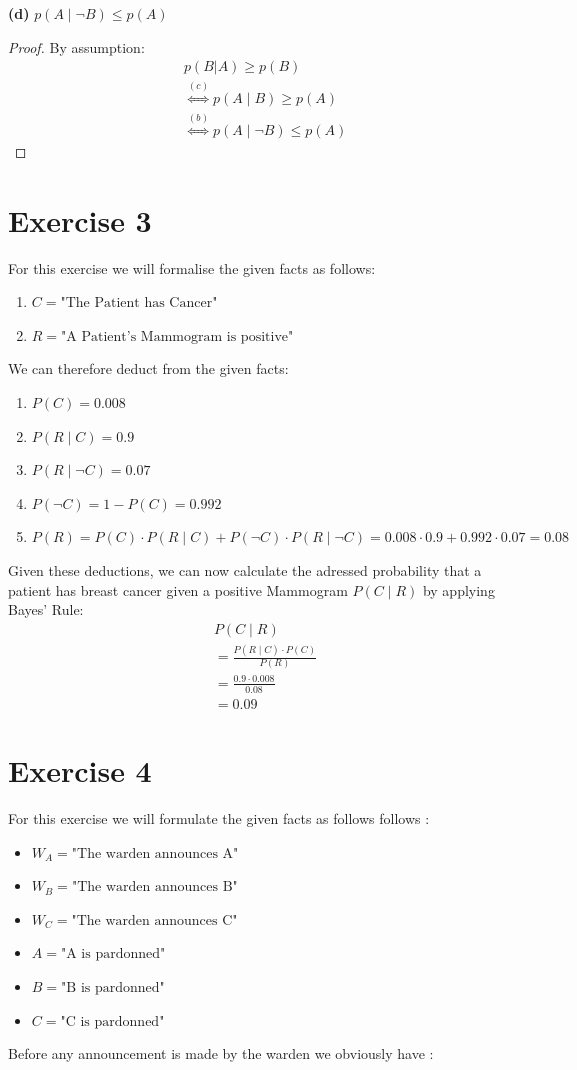 \documentclass{article}
\begin{document}
\textbf{(d)} $p(A \mid \neg B) \leq p(A)$
\begin{proof}
By assumption:
\begin{align*}
& p(B|A) \geq p(B) \\
& \overset{(c)}{\Leftrightarrow} p(A \mid B) \geq p(A)
\\
& \overset{(b)}{\Leftrightarrow} p(A \mid \neg B) \leq p(A)
\end{align*}
\end{proof}

\section*{Exercise 3}
 For this exercise we will formalise the given facts as follows:
 \begin{enumerate}
 \item $C = \text{"The Patient has Cancer"}$
 \item $R = \text{"A Patient's Mammogram is positive"}$
 \end{enumerate}
We can therefore deduct from the given facts:
\begin{enumerate}
 \item $P(C)= 0.008$
 \item $P(R \mid C) = 0.9$
 \item $P(R \mid \neg C) = 0.07$
 \item $P(\neg C)=1-P(C)= 0.992$
 \item $P(R)=P(C)\cdot P(R \mid C) + P(\neg C)\cdot P(R \mid \neg C) = 0.008 \cdot 0.9 + 0.992\cdot 0.07 = 0.08 $
 \end{enumerate}
Given these deductions, we can now calculate the adressed probability that a patient has breast cancer given a positive Mammogram $P(C \mid R)$ by applying Bayes' Rule:
\begin{align*}
& P(C \mid R) \\
& = \frac{P(R\mid C)\cdot P(C)}{P(R)} \\
& = \frac{0.9\cdot 0.008}{0.08}\\
& = 0.09
\end{align*}
 
\section*{Exercise 4}
For this exercise we will formulate the given facts as follows follows :

\begin{itemize}
\item $W_A = \text{"The warden announces A"}$
\item $W_B = \text{"The warden announces B"}$
\item $W_C = \text{"The warden announces C"}$

\item $A=\text{"A is pardonned"}$
\item $B=\text{"B is pardonned"}$
\item $C=\text{"C is pardonned"}$

\end{itemize}
Before any announcement is made by the warden we obviously have :
\end{document}
